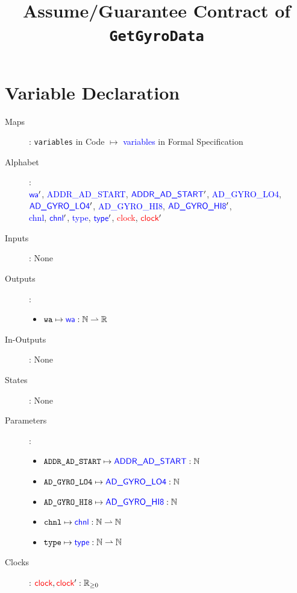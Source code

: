 \documentclass[fleqn,a4paper]{article}
\newcommand\var[1]{\texttt{#1}}
\newcommand\Var[1]{\textcolor{blue}{\textsf{#1}}}
\newcommand\clock{\textcolor{red}{\textsf{clock}}}
\begin{document}
\title{Assume/Guarantee Contract of \texttt{GetGyroData}}
\author{}

\maketitle

\section{Variable Declaration}

\begin{description}
\item[Maps]:
\var{variables} in Code $\mapsto$ \Var{variables} in Formal Specification

\item[Alphabet]: \\
$\Var{wa}'$,
\Var{ADDR\_AD\_START},
$\Var{ADDR\_AD\_START}'$,
\Var{AD\_GYRO\_LO4},
$\Var{AD\_GYRO\_LO4}'$,
\Var{AD\_GYRO\_HI8},
$\Var{AD\_GYRO\_HI8}'$, \\
\Var{chnl},
$\Var{chnl}'$,
\Var{type},
$\Var{type}'$,
\clock,
$\clock'$

\item[Inputs]: None

\item[Outputs]:
\begin{itemize}
\item $\var{wa} \mapsto \Var{wa} : \mathbb{N} \rightharpoonup \mathbb{R}$
\end{itemize}

\item[In-Outputs]: None

\item[States]: None

\item[Parameters]:
\begin{itemize}
\item $\var{ADDR\_AD\_START} \mapsto \Var{ADDR\_AD\_START} : \mathbb{N}$
\item $\var{AD\_GYRO\_LO4} \mapsto \Var{AD\_GYRO\_LO4} : \mathbb{N}$
\item $\var{AD\_GYRO\_HI8} \mapsto \Var{AD\_GYRO\_HI8} : \mathbb{N}$
\item $\var{chnl} \mapsto \Var{chnl} : \mathbb{N} \rightharpoonup \mathbb{N}$
\item $\var{type} \mapsto \Var{type} : \mathbb{N} \rightharpoonup \mathbb{N}$
\end{itemize}

\item[Clocks]:
$\clock,\clock' : \mathbb{R}_{\geq 0}$

\end{description}
\end{document}

